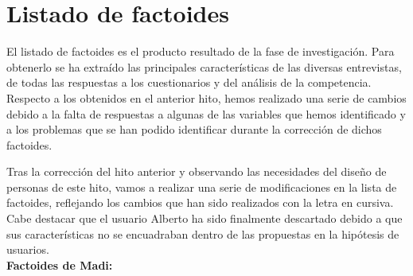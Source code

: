 \section{Listado de factoides}
El listado de factoides es el producto resultado de la fase de investigación. Para obtenerlo se ha extraído las principales características de las
diversas entrevistas, de todas las respuestas a los cuestionarios y del análisis de la competencia. Respecto a los obtenidos en el anterior hito,
hemos realizado una serie de cambios debido a la falta de respuestas a algunas de las variables que hemos identificado y a los problemas que se
han podido identificar durante la corrección de dichos factoides.


Tras la corrección del hito anterior y observando las necesidades del diseño de personas de este hito, vamos a realizar una serie de modificaciones
en la lista de factoides, reflejando los cambios que han sido realizados con la letra en cursiva. Cabe destacar que el usuario Alberto ha sido finalmente
descartado debido a que sus características no se encuadraban dentro de las propuestas en la hipótesis de usuarios. \\

\textbf{Factoides de Madi:}

